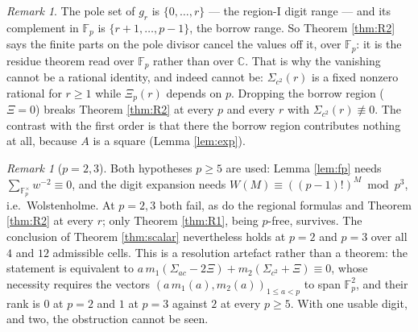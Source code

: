 \documentclass[11pt,a4paper]{amsart}
\theoremstyle{plain}
\theoremstyle{definition}
\theoremstyle{remark}
\newtheorem{remark}[theorem]{Remark}
\newcommand{\FF}{\mathbb{F}}
\newcommand{\CC}{\mathbb{C}}
\newcommand{\A}{A}
\begin{document}
\begin{remark}
The pole set of $g_r$ is $\{0,\dots,r\}$ — the region-I digit range — and its complement
in $\FF_p$ is $\{r+1,\dots,p-1\}$, the borrow range. So Theorem \ref{thm:R2} says the
finite parts on the pole divisor cancel the values off it, over $\FF_p$: it is the
residue theorem read over $\FF_p$ rather than over $\CC$. That is why the vanishing
cannot be a rational identity, and indeed cannot be: $\Sigma_{c^2}(r)$ is a fixed nonzero
rational for $r\ge1$ while $\Xi_p(r)$ depends on $p$. Dropping the borrow region
($\Xi=0$) breaks Theorem \ref{thm:R2} at every $p$ and every $r$ with
$\Sigma_{c^2}(r)\not\equiv0$. The contrast with the first order is that there the borrow
region contributes nothing at all, because $\A$ is a square (Lemma \ref{lem:exp}).
\end{remark}

\begin{remark}[$p=2,3$]
Both hypotheses $p\ge5$ are used: Lemma \ref{lem:fp} needs
$\sum_{\FF_p^\times}w^{-2}\equiv0$, and the digit expansion needs
$W(M)\equiv((p-1)!)^M \bmod p^3$, i.e.\ Wolstenholme. At $p=2,3$ both fail, as do the
regional formulas and Theorem \ref{thm:R2} at every $r$; only Theorem \ref{thm:R1},
being $p$-free, survives. The conclusion of Theorem \ref{thm:scalar} nevertheless holds
at $p=2$ and $p=3$ over all $4$ and $12$ admissible cells. This is a resolution artefact
rather than a theorem: the statement is equivalent to
$a\,m_1(\Sigma_{ac}-2\Xi)+m_2(\Sigma_{c^2}+\Xi)\equiv0$, whose necessity requires the
vectors $(a\,m_1(a),m_2(a))_{1\le a<p}$ to span $\FF_p^2$, and their rank is $0$ at
$p=2$ and $1$ at $p=3$ against $2$ at every $p\ge5$. With one usable digit, and two, the
obstruction cannot be seen.
\end{remark}
\end{document}
